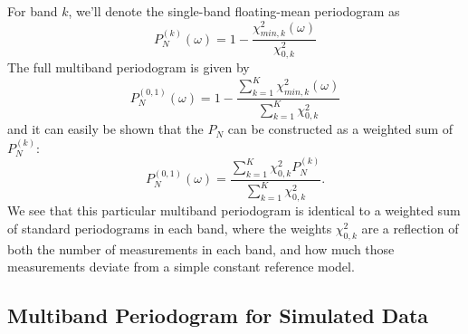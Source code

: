 \documentclass[12pt,preprint]{aastex}
\newcommand{\sectlabel}[1]{\label{sect:#1}}
\begin{document}
For band $k$, we'll denote the single-band floating-mean periodogram as
\begin{equation}
  P_N^{(k)}(\omega) = 1 - \frac{\chi^2_{min, k}(\omega)}{\chi^2_{0,k}}
\end{equation}
The full multiband periodogram is given by
\begin{equation}
  P_N^{(0,1)}(\omega) = 1 - \frac{\sum_{k=1}^K\chi^2_{min, k}(\omega)}{\sum_{k=1}^K\chi^2_{0,k}}
\end{equation}
and it can easily be shown that the $P_N$ can be constructed as a weighted sum of $P_N^{(k)}$:
\begin{equation}
  P_N^{(0,1)}(\omega) = \frac{\sum_{k=1}^K\chi^2_{0,k}P_N^{(k)}}{\sum_{k=1}^K\chi^2_{0,k}}.
\end{equation}
We see that this particular multiband periodogram is identical to a weighted sum of standard periodograms in each band, where the weights $\chi^2_{0,k}$ are a reflection of both the number of measurements in each band, and how much those measurements deviate from a simple constant reference model.

\subsection{Multiband Periodogram for Simulated Data}
\sectlabel{Simulated}
\end{document}
